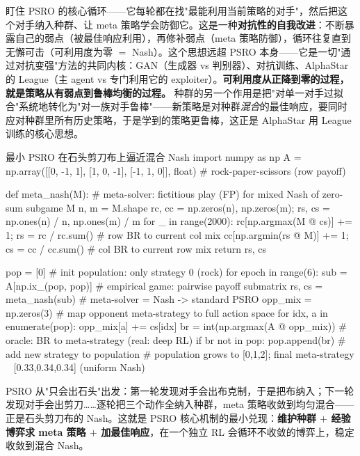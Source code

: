 \begin{insight}[PSRO $=$ 用"最能利用我的对手"反复打磨自己]
盯住 PSRO 的核心循环——它每轮都在找"最能利用当前策略的对手"，然后把这个对手纳入种群、让 meta 策略学会防御它。这是一种\textbf{对抗性的自我改进}：不断暴露自己的弱点（被最佳响应利用），再修补弱点（meta 策略防御），循环往复直到无懈可击（可利用度为零 $=$ Nash）。这个思想远超 PSRO 本身——它是一切"通过对抗变强"方法的共同内核：GAN（生成器 vs 判别器）、对抗训练、AlphaStar 的 League（主 agent vs 专门利用它的 exploiter）。\textbf{可利用度从正降到零的过程，就是策略从有弱点到鲁棒均衡的过程。} 种群的另一个作用是把"对单一对手过拟合"系统地转化为"对一族对手鲁棒"——新策略是对种群\emph{混合}的最佳响应，要同时应对种群里所有历史策略，于是学到的策略更鲁棒，这正是 AlphaStar 用 League 训练的核心思想。
\end{insight}

\begin{codebox}[Python]{最小 PSRO 在石头剪刀布上逼近混合 Nash}
import numpy as np
A = np.array([[0, -1, 1], [1, 0, -1], [-1, 1, 0]], float)   # rock-paper-scissors (row payoff)

def meta_nash(M):
    # meta-solver: fictitious play (FP) for mixed Nash of zero-sum subgame M
    n, m = M.shape
    rc, cc = np.zeros(n), np.zeros(m); rs, cs = np.ones(n) / n, np.ones(m) / m
    for _ in range(2000):
        rc[np.argmax(M @ cs)] += 1; rs = rc / rc.sum()         # row BR to current col mix
        cc[np.argmin(rs @ M)] += 1; cs = cc / cc.sum()         # col BR to current row mix
    return rs, cs

pop = [0]                                       # init population: only strategy 0 (rock)
for epoch in range(6):
    sub = A[np.ix_(pop, pop)]                   # empirical game: pairwise payoff submatrix
    rs, cs = meta_nash(sub)                     # meta-solver = Nash -> standard PSRO
    opp_mix = np.zeros(3)                        # map opponent meta-strategy to full action space
    for idx, a in enumerate(pop):
        opp_mix[a] += cs[idx]
    br = int(np.argmax(A @ opp_mix))            # oracle: BR to meta-strategy (real: deep RL)
    if br not in pop:
        pop.append(br)                          # add new strategy to population
# population grows to [0,1,2]; final meta-strategy ~ [0.33,0.34,0.34] (uniform Nash)
\end{codebox}

PSRO 从"只会出石头"出发：第一轮发现对手会出布克制，于是把布纳入；下一轮发现对手会出剪刀……逐轮把三个动作全纳入种群，meta 策略收敛到均匀混合——正是石头剪刀布的 Nash。这就是 PSRO 核心机制的最小兑现：\textbf{维护种群 $+$ 经验博弈求 meta 策略 $+$ 加最佳响应}，在一个独立 RL 会循环不收敛的博弈上，稳定收敛到混合 Nash。

